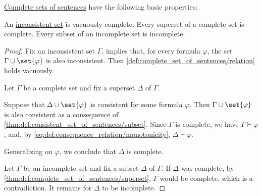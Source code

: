 \begin{proposition}\label{thm:def:complete_set_of_sentences}
  \hyperref[def:complete_set_of_sentences]{Complete sets of sentences} have the following basic properties:
  \begin{thmenum}
     An \hyperref[def:consistent_set_of_sentences]{inconsistent set} is vacuously complete.
     Every superset of a complete set is complete.
     Every subset of an incomplete set is incomplete.
  \end{thmenum}
\end{proposition}
\begin{proof}
   Fix an inconsistent set \( \Gamma \).  implies that, for every formula \( \varphi \), the set \( \Gamma \cup \set{ \varphi } \) is also inconsistent. Then \cref{def:complete_set_of_sentences/relation} holds vacuously.

   Let \( \Gamma \) be a complete set and fix a superset \( \Delta \) of \( \Gamma \).

  Suppose that \( \Delta \cup \set{ \varphi } \) is consistent for some formula \( \varphi \). Then \( \Gamma \cup \set{ \varphi } \) is also consistent as a consequence of \cref{thm:def:consistent_set_of_sentences/subset}. Since \( \Gamma \) is complete, we have \( \Gamma \vdash \varphi \), and, by \eqref{eq:def:consequence_relation/monotonicity}, \( \Delta \vdash \varphi \).

  Generalizing on \( \varphi \), we conclude that \( \Delta \) is complete.

   Let \( \Gamma \) be an incomplete set and fix a subset \( \Delta \) of \( \Gamma \). If \( \Delta \) was complete, by \cref{thm:def:complete_set_of_sentences/superset}, \( \Gamma \) would be complete, which is a contradiction. It remains for \( \Delta \) to be incomplete.
\end{proof}

